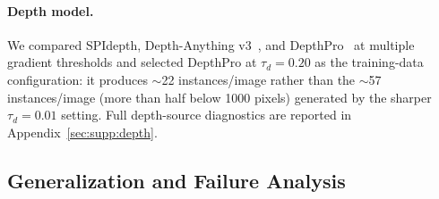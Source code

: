 \documentclass{article}
\begin{document}
\paragraph{Depth model.}
We compared SPIdepth, Depth-Anything v3~\cite{lin2025da3}, and DepthPro~\cite{bochkovskii2024depthpro} at multiple gradient thresholds and selected DepthPro at $\tau_d{=}0.20$ as the training-data configuration: it produces $\sim$22 instances/image rather than the $\sim$57 instances/image (more than half below 1000 pixels) generated by the sharper $\tau_d{=}0.01$ setting. Full depth-source diagnostics are reported in Appendix~\ref{sec:supp:depth}.


\subsection{Generalization and Failure Analysis}
\label{sec:exp:generalization}
\end{document}
